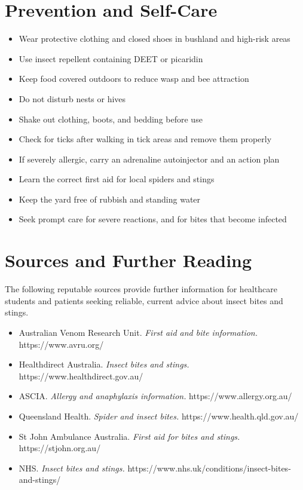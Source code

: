 \section*{Prevention and Self-Care}
\begin{itemize}
    \item Wear protective clothing and closed shoes in bushland and high-risk areas
    \item Use insect repellent containing DEET or picaridin
    \item Keep food covered outdoors to reduce wasp and bee attraction
    \item Do not disturb nests or hives
    \item Shake out clothing, boots, and bedding before use
    \item Check for ticks after walking in tick areas and remove them properly
    \item If severely allergic, carry an adrenaline autoinjector and an action plan
    \item Learn the correct first aid for local spiders and stings
    \item Keep the yard free of rubbish and standing water
    \item Seek prompt care for severe reactions, and for bites that become infected
\end{itemize}

\section*{Sources and Further Reading}
The following reputable sources provide further information for healthcare students and patients seeking reliable, current advice about insect bites and stings.
\begin{itemize}
    \item Australian Venom Research Unit. \textit{First aid and bite information.} https://www.avru.org/
    \item Healthdirect Australia. \textit{Insect bites and stings.} https://www.healthdirect.gov.au/
    \item ASCIA. \textit{Allergy and anaphylaxis information.} https://www.allergy.org.au/
    \item Queensland Health. \textit{Spider and insect bites.} https://www.health.qld.gov.au/
    \item St John Ambulance Australia. \textit{First aid for bites and stings.} https://stjohn.org.au/
    \item NHS. \textit{Insect bites and stings.} https://www.nhs.uk/conditions/insect-bites-and-stings/
\end{itemize}
